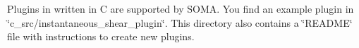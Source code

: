 Plugins in written in C are supported by SOMA. You find an example plugin in \char`\"{}c\+\_\+src/instantaneous\+\_\+shear\+\_\+plugin\char`\"{}. This directory also contains a \char`\"{}\+README\char`\"{} file with instructions to create new plugins.


\begin{DoxyCodeInclude}{0}

\end{DoxyCodeInclude}
 